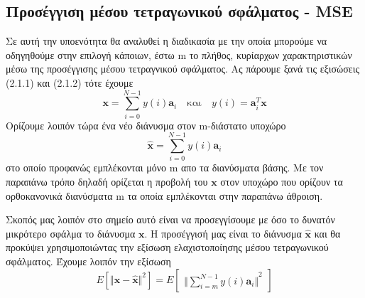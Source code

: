 \subsection{Προσέγγιση μέσου τετραγωνικού σφάλματος - \textlatin{MSE}}
\par
Σε αυτή την υποενότητα θα αναλυθεί η διαδικασία με την οποία μπορούμε να οδηγηθούμε στην επιλογή κάποιων, έστω \textlatin{m} το πλήθος, κυρίαρχων χαρακτηριστικών μέσω της προσέγγισης μέσου τετραγνικού σφάλματος. Ας πάρουμε ξανά τις εξισώσεις  (2.1.1) και (2.1.2) τότε έχουμε
\newline\hspace*{\fill}
\begin{equation}
        \mathbf{x} = \sum_{i=0}^{N-1} y(i)\mathbf{a}_{i} \quad \text{και} \quad y(i)=\mathbf{a}_{i}^{T}\mathbf{x}
\end{equation}
\hspace*{\fill}\newline
Ορίζουμε λοιπόν τώρα ένα νέο διάνυσμα στον \textlatin{m}-διάστατο υποχώρο
\newline\hspace*{\fill}
\begin{equation}
        \mathbf{\widehat{x}} = \sum_{i=0}^{N-1} y(i)\mathbf{a}_{i}
\end{equation}
\hspace*{\fill}\newline
στο οποίο προφανώς εμπλέκονται μόνο \textlatin{m} απο τα διανύσματα βάσης. Με τον παραπάνω τρόπο δηλαδή ορίζεται η προβολή του $\mathbf{x}$ στον υποχώρο που ορίζουν τα ορθοκανονικά διανύσματα \textlatin{m} τα οποία εμπλέκονται στην παραπάνω άθροιση. 
\par
Σκοπός μας λοιπόν στο σημείο αυτό είναι να προσεγγίσουμε με όσο το δυνατόν μικρότερο σφάλμα το διάνυσμα $\mathbf{x}$. Η προσέγγισή μας είναι το διάνυσμα $\mathbf{\widehat{x}}$ και θα προκύψει χρησιμοποιώντας την εξίσωση ελαχιστοποίησης μέσου τετραγωνικού σφάλματος. Έχουμε λοιπόν την εξίσωση 
\newline\hspace*{\fill}
\begin{equation}
        Ε[{\Vert \mathbf{x}-\mathbf{\widehat{x}} \Vert}^{2}] = E 			\begin{bmatrix}
	{\Vert \sum_{i=m}^{N-1} y(i)\mathbf{a}_{i} \Vert}^{2}        
        \end{bmatrix}
\end{equation}
\hspace*{\fill}\newline
